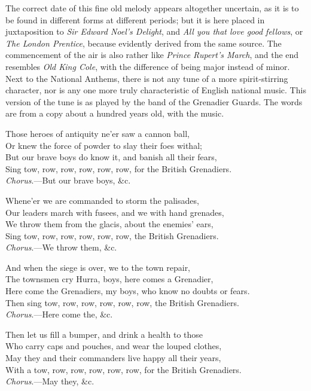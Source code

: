 
The correct date of this fine old melody appears altogether uncertain, as it
is to be found in different forms at different periods; but it is here placed in juxtaposition
to \textit{Sir Edward Noel’s Delight}, and \textit{All you that love good fellows}, or
\textit{The London Prentice}, because evidently derived from the same source. The
commencement of the air is also rather like \textit{Prince Rupert’s March}, and the end
resembles \textit{Old King Cole}, with the difference of being major instead of minor.
Next to the National Anthems, there is not any tune of a more spirit-stirring
character, nor is any one more truly characteristic of English national music.
This version of the tune is as played by the band of the Grenadier Guards. The
words are from a copy about a hundred years old, with the music.



\settowidth{\versewidth}{Sing tow, row, row, row, row, row, for the British Grenadiers.}
\begin{scverse}
Those heroes of antiquity ne’er saw a cannon ball,\\
Or knew the force of powder to slay their foes withal;\\
But our brave boys do know it, and banish all their fears,\\
Sing tow, row, row, row, row, row, for the British Grenadiers.\\
\vin\vin\vin\vin\vin\vin\textit{Chorus}.—But our brave boys, \&c.
\end{scverse}
\pagebreak


\begin{scverse}
Whene’er we are commanded to storm the palisades,\\
Our leaders march with fusees, and we with hand grenades,\\
We throw them from the glacis, about the enemies’ ears,\\
Sing tow, row, row, row, row, row, the British Grenadiers.\\
\vin\vin\vin\vin\vin\vin\textit{Chorus}.—We throw them, \&c.

And when the siege is over, we to the town repair,\\
The townsmen cry Hurra, boys, here comes a Grenadier,\\
Here come the Grenadiers, my boys, who know no doubts or fears.\\
Then sing tow, row, row, row, row, row, the British Grenadiers.\\
\vin\vin\vin\vin\vin\vin\textit{Chorus}.—Here come the, \&c.

Then let us fill a bumper, and drink a health to those\\
Who carry caps and pouches, and wear the louped clothes,\\
May they and their commanders live happy all their years,\\
With a tow, row, row, row, row, row, for the British Grenadiers.\\
\vin\vin\vin\vin\vin\vin\textit{Chorus}.—May they, \&c.
\end{scverse}

